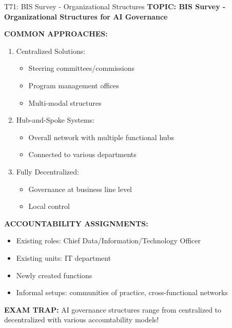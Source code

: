 \documentclass[8pt]{beamer}
\begin{document}
	\begin{frame}{T71: BIS Survey - Organizational Structures}
		\fontsize{6.5}{7.5}\selectfont
		\textbf{TOPIC: BIS Survey - Organizational Structures for AI Governance}
		
		\vspace{0.1cm}
		\textbf{COMMON APPROACHES:}
		\begin{enumerate}
			\item \textcolor{myblue}{Centralized Solutions:}
			\begin{itemize}
				\item Steering committees/commissions
				\item Program management offices
				\item Multi-modal structures
			\end{itemize}
			\item \textcolor{myblue}{Hub-and-Spoke Systems:}
			\begin{itemize}
				\item Overall network with multiple functional hubs
				\item Connected to various departments
			\end{itemize}
			\item \textcolor{myblue}{Fully Decentralized:}
			\begin{itemize}
				\item Governance at business line level
				\item Local control
			\end{itemize}
		\end{enumerate}
		
		\vspace{0.1cm}
		\textbf{ACCOUNTABILITY ASSIGNMENTS:}
		\begin{itemize}
			\item Existing roles: Chief Data/Information/Technology Officer
			\item Existing units: IT department
			\item Newly created functions
			\item Informal setups: communities of practice, cross-functional networks
		\end{itemize}
		
		\textcolor{myred}{\textbf{EXAM TRAP:}} AI governance structures range from \textcolor{myblue}{centralized to decentralized with various accountability models}!
	\end{frame}
	
\end{document}
